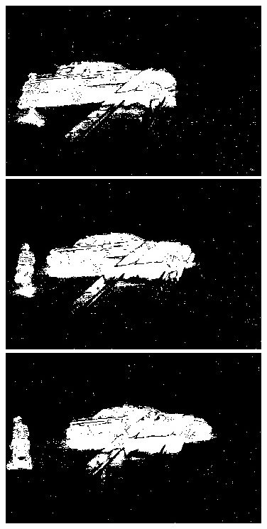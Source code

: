 \documentclass[a4paper]{ctexart}
\begin{document}
\begin{figure}[htbp]
\begin{minipage}[t]{0.2\textwidth}
	\end{minipage}\\
	\begin{minipage}[t]{0.2\textwidth}
		\centering
		\includegraphics[width=\textwidth]{figure/frames/single_gN80340.jpg}
	\end{minipage}
	\begin{minipage}[t]{0.2\textwidth}
		\centering
		\includegraphics[width=\textwidth]{figure/frames/single_gN80345.jpg}
	\end{minipage}
	\begin{minipage}[t]{0.2\textwidth}
		\centering
		\includegraphics[width=\textwidth]{figure/frames/single_gN80350.jpg}

\end{minipage}
\end{figure}
\end{document}
